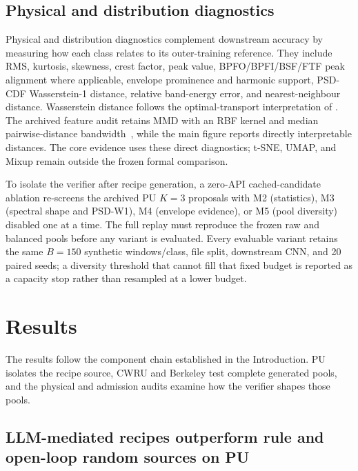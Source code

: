 \documentclass[a4paper,fleqn]{cas-sc}
\begin{document}


\subsection{Physical and distribution diagnostics}

Physical and distribution diagnostics complement downstream accuracy by
measuring how each class relates to its outer-training reference. They include
RMS, kurtosis, skewness, crest factor, peak value, BPFO/BPFI/BSF/FTF peak
alignment where applicable, envelope prominence and harmonic support, PSD-CDF
Wasserstein-1 distance, relative band-energy error, and nearest-neighbour
distance. Wasserstein distance follows the optimal-transport interpretation of
\citet{villani2009transport}. The archived feature audit retains MMD with an RBF
kernel and median pairwise-distance bandwidth~\citep{gretton2012mmd}, while the
main figure reports directly interpretable distances. The core evidence uses
these direct diagnostics; t-SNE, UMAP, and Mixup remain outside the frozen
formal comparison.

To isolate the verifier after recipe generation, a zero-API cached-candidate
ablation re-screens the archived PU $K=3$ proposals with M2 (statistics), M3
(spectral shape and PSD-W1), M4 (envelope evidence), or M5 (pool diversity)
disabled one at a time. The full replay must reproduce the frozen raw and
balanced pools before any variant is evaluated. Every evaluable variant retains
the same $B=150$ synthetic windows/class, file split, downstream CNN, and 20
paired seeds; a diversity threshold that cannot fill that fixed budget is
reported as a capacity stop rather than resampled at a lower budget.

\section{Results}
\label{sec:results}

The results follow the component chain established in the Introduction. PU
isolates the recipe source, CWRU and Berkeley test complete generated pools,
and the physical and admission audits examine how the verifier shapes those
pools.

\subsection{LLM-mediated recipes outperform rule and open-loop random sources
on PU}
\end{document}
